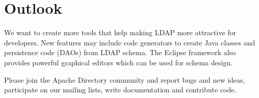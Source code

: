 \documentclass[a4paper,11pt,oneside]{article}
\begin{document}
\section{Outlook}
We want to create more tools that help making LDAP more attractive for developers. New features may include code generators to create Java classes and persistence code (DAOs) from LDAP schema. The Eclipse framework also provides powerful graphical editors which can be used for schema design. 

Please join the Apache Directory community and report bugs and new ideas, participate on our mailing lists, write documentation and contribute code.
\end{document}
